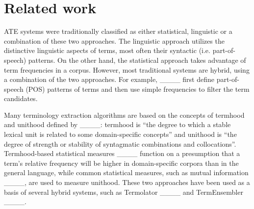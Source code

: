 \section{Related work}
\label{sec:related}

ATE systems were traditionally classified as either statistical, linguistic or a combination of these two approaches. The linguistic approach utilizes the distinctive linguistic aspects of terms, most often their syntactic (i.e. part-of-speech) patterns. On the other hand, the statistical approach takes advantage of term frequencies in a corpus. However, most traditional systems are hybrid, using a combination of the two approaches. For example, ____ first define part-of-speech (POS) patterns of terms and then use simple frequencies to filter the term candidates.  

Many terminology extraction algorithms are based on the concepts of term\-hood and unit\-hood defined by ____: termhood is “the degree to which a stable lexical unit is related to some domain-specific concepts” and unithood is “the degree of strength or stability of syntagmatic combinations and collocations”. Termhood-based statistical measures ____ function on a presumption that a term’s relative frequency will be higher in domain-specific corpora than in the general language, while common statistical measures, such as mutual information ____, are used to measure unithood. These two approaches have been used as a basis of several hybrid systems, such as Termolator ____ and TermEnsembler ____.

